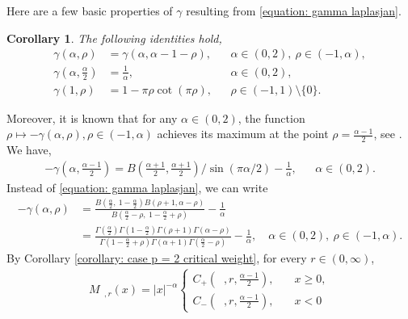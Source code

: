 \documentclass[12pt, a4paper]{amsart}
\newtheorem{corollary}[theorem]{Corollary}
\DeclareMathOperator{\Masss}{\nu_{\alpha}^{(\boldsymbol{a})}}
\begin{document}
Here are a few basic properties of $\gamma$ resulting from \cref{equation: gamma laplasjan}.
\begin{corollary}The following identities hold,
\begin{align*}
    \gamma(\alpha, \rho) &= \gamma(\alpha, \alpha - 1- \rho), && \alpha \in (0, 2),\ \rho \in (-1, \alpha), \\
    \gamma\left( \alpha, \frac{\alpha}{2} \right) &= \frac{1}{\alpha}, && \alpha \in (0, 2), \\
    \gamma(1, \rho) &=
    1 - \pi\rho\cot(\pi\rho), && \rho \in (-1, 1)\setminus\{0\}.
\end{align*}
\end{corollary}
Moreover, it is known that for any $\alpha \in (0, 2)$, the function $\rho \mapsto -\gamma(\alpha, \rho), \rho \in (-1, \alpha)$ achieves its maximum at the point $\rho = \frac{\alpha-1}{2}$,
see \cite[page 632, paragraph between (1.8) and (1.9)]{2011-KB-BD-mn}. We have,
\begin{align*}
    -\gamma \left(\alpha, \frac{\alpha - 1}{2} \right) = B\left(\frac{\alpha + 1}{2}, \frac{\alpha + 1}{2} \right)/\sin(\pi\alpha/2) - \frac{1}{\alpha}, &&\alpha \in (0, 2).
\end{align*}
Instead of \eqref{equation: gamma laplasjan}, we can write
\begin{align*}
    -\gamma(\alpha, \rho) &= \frac{B\left(\frac{\alpha}{2},\ 1-\frac{\alpha}{2}\right)B\left(\rho+1,\alpha-\rho\right)}{B\left(\frac{\alpha}{2}-\rho,\ 1-\frac{\alpha}{2}+\rho\right)}-\frac{1}{\alpha}
    \\
    &=\frac{\Gamma\left(\frac{\alpha}{2}\right)\Gamma\left(1-\frac{\alpha}{2}\right)\Gamma\left(\rho+1\right)\Gamma\left(\alpha-\rho\right)}{\Gamma\left(1-\frac{\alpha}{2}+\rho\right)\Gamma\left(\alpha+1\right)\Gamma\left(\frac{\alpha}{2}-\rho\right)}-\frac{1}{\alpha}, \quad \alpha \in (0, 2),\ \rho \in (-1, \alpha).
\end{align*}
By Corollary \cref{corollary: case p = 2 critical weight}, for every $r \in (0, \infty)$,
\begin{align*}
    M_{\Masss, r}(x) = |x|^{-\alpha}\begin{cases}
        C_+\left(\Masss, r, \frac{\alpha - 1} {2}\right), \quad &x \geq 0,
        \\[1ex]
        C_-\left(\Masss, r, \frac{\alpha - 1} {2}\right), \quad &x < 0
    \end{cases}
\end{align*}
\end{document}

